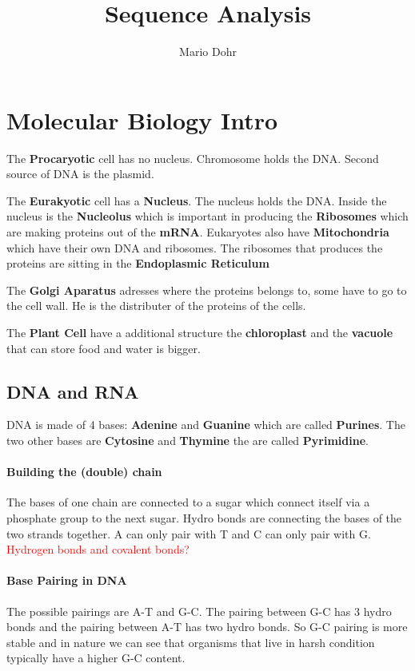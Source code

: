 \documentclass[10pt,a4paper]{article}
\author{Mario Dohr}
\title{Sequence Analysis}
\begin{document}
\maketitle

\section{Molecular Biology Intro}
The \textbf{Procaryotic} cell has no nucleus. Chromosome holds the DNA. Second source of DNA is the plasmid.

The \textbf{Eurakyotic} cell has a \textbf{Nucleus}. The nucleus holds the DNA. Inside the nucleus is the \textbf{Nucleolus} which is important in producing the \textbf{Ribosomes} which are making proteins out of the \textbf{mRNA}. Eukaryotes also have \textbf{Mitochondria} which have their own DNA and ribosomes.
The ribosomes that produces the proteins are sitting in the \textbf{Endoplasmic Reticulum}

The \textbf{Golgi Aparatus} adresses where the proteins belongs to, some have to go to the cell wall. He is the distributer of the proteins of the cells.

The \textbf{Plant Cell} have a additional structure the \textbf{chloroplast} and the \textbf{vacuole} that can store food and water is bigger.

\subsection{DNA and RNA}

DNA is made of 4 bases: \textbf{Adenine} and \textbf{Guanine} which are called \textbf{Purines}. The two other bases are \textbf{Cytosine} and \textbf{Thymine} the are called \textbf{Pyrimidine}.

\paragraph{Building the (double) chain}
The bases of one chain are connected to a sugar which connect itself via a phosphate group to the next sugar.
Hydro bonds are connecting the bases of the two strands together. A can only pair with T and C can only pair with G. \textcolor{red}{Hydrogen bonds and covalent bonds?}

\paragraph{Base Pairing in DNA}
The possible pairings are A-T and G-C. The pairing between G-C has 3 hydro bonds and the pairing between A-T has two hydro bonds. So G-C pairing is more stable and in nature we can see that organisms that live in harsh condition typically have a higher G-C content.
\end{document}
